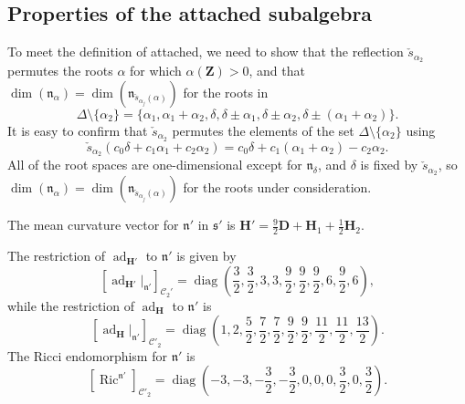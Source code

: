 \documentclass[12pt]{amsart}
\newcommand{\smallfrac}[2]{\textstyle{\frac{#1}{#2}}  }
\newcommand{\bfZ}{\ensuremath{\mathbf Z} }
\newcommand{\bfD}{\ensuremath{\mathbf D} }
\newcommand{\bfH}{\ensuremath{\mathbf H} }
\newcommand{\calC}{\ensuremath{\mathcal{C}} }
\newcommand{\frakn}{\ensuremath{\mathfrak{n}} }
\newcommand\n{{\mathfrak{n}}}
\newcommand\s{{\mathfrak{s}}}
\newcommand\diag{\operatorname{diag}}
\newcommand\ad{\operatorname{ad}}
\newcommand{\Ric}{\operatorname{Ric}}
\theoremstyle{plain}
\theoremstyle{definition}
\theoremstyle{remark}
\numberwithin{equation}{section}
\numberwithin{theorem}{section}
\begin{document}
\subsection{Properties of the attached subalgebra}
  To meet the definition of attached, we need to show that the  reflection  $\check{s}_{\alpha_2}$    permutes the 
  roots $\alpha$ for which 
$\alpha(\bfZ)>0$, and  that 
$\dim(\n_\alpha) = \dim(\n_{\check{s}_{\alpha_j}(\alpha)})$ for the roots in 
\[ \Delta \setminus \{\alpha_2 \} =  \{ \alpha_1,  \alpha_1+\alpha_2, \delta, \delta \pm \alpha_1, \delta \pm \alpha_2, \delta \pm (\alpha_1+\alpha_2)\}. \]
It is easy to confirm that $\check{s}_{\alpha_2}$    permutes the elements of the set $ \Delta \setminus \{\alpha_2 \} $ using
\[ \check{s}_{\alpha_2}(c_0 \delta + c_1 \alpha_1 + c_2 \alpha_2)= c_0 \delta +c_1 (\alpha_1 + \alpha_2)  -c_2 \alpha_2.\]
All of the root spaces are one-dimensional except for $\frakn_\delta$, and $\delta$  is fixed by  $\check{s}_{\alpha_2}$, so 
$\dim(\n_\alpha) = \dim(\n_{\check{s}_{\alpha_j}(\alpha)})$ for the roots under consideration.

The mean curvature vector for  $\n'$ in $\s'$ is 
$\bfH' = \tfrac92\bfD + \bfH_1 + \tfrac12 \bfH_2.$

The restriction of 
$\ad_{\bfH'}$ to $\n'$ is given by
\begin{equation}\label{eqn: adH'} 
[\ad_{\bfH'}|_{\frakn'}]_{\calC_2'} = 
\diag\left(\smallfrac32, \smallfrac32, 3, 3, \smallfrac92, \smallfrac92, \smallfrac92, 6, \smallfrac92, 6\right),\end{equation}
while the restriction of 
$\ad_{\bfH}$ to $\n'$ is
\begin{equation}\label{eqn: adH} 
[\ad_{\bfH}|_{\frakn'}]_{\calC'_2} = \diag\left(1, 2, \smallfrac52, \smallfrac72, \smallfrac72, \smallfrac92, \smallfrac92, \smallfrac{11}{2}, \smallfrac{11}{2}, \smallfrac{13}{2}\right).  \end{equation}
The  Ricci endomorphism for  $\n'$ is
\begin{equation}\label{eqn: Ric nprime}
[\Ric^{\n'}]_{\calC'_2} = \diag\left(-3,-3,-\smallfrac 32,-\smallfrac 32, 0,0,0,\frac 32, 0, \smallfrac 32\right).
\end{equation}
\end{document}
